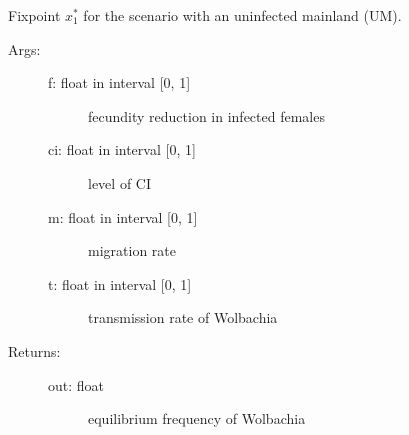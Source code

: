 \documentclass[letterpaper,10pt,english]{sphinxmanual}
\begin{document}
\begin{fulllineitems}
\label{index:wspec.analytical.fix1_UM}
Fixpoint $x_1^{\ast}$ for the scenario with an uninfected mainland (UM).
\begin{description}
\item[{Args:}] \leavevmode\begin{description}
\item[{f: float in interval {[}0, 1{]}}] \leavevmode
fecundity reduction in infected females

\item[{ci: float in interval {[}0, 1{]}}] \leavevmode
level of CI

\item[{m: float in interval {[}0, 1{]}}] \leavevmode
migration rate

\item[{t: float in interval {[}0, 1{]}}] \leavevmode
transmission rate of Wolbachia

\end{description}

\item[{Returns:}] \leavevmode\begin{description}
\item[{out: float}] \leavevmode
equilibrium frequency of Wolbachia

\end{description}

\end{description}

\end{fulllineitems}

\end{document}
